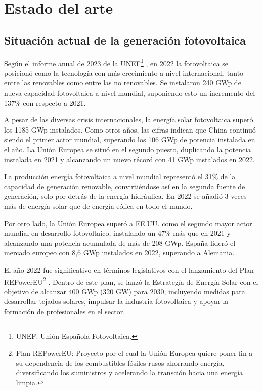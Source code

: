 \chapter{Estado del arte}
\label{chap:estado-arte}
\section{Situación actual de la generación fotovoltaica}
\label{sec:orge7633b7}
\label{sec:situacion-actual-generacion-fotovoltaica}
Según el informe anual de 2023 de la UNEF\footnote{UNEF: Unión Española Fotovoltaica.} \cite{unef23}, en 2022 la fotovoltaica se posicionó como la tecnología con más crecimiento a nivel internacional, tanto entre las renovables como entre las no renovables. Se instalaron 240 GWp de nueva capacidad fotovoltaica a nivel mundial, suponiendo esto un incremento del 137\% con respecto a 2021.

A pesar de las diversas crisis internacionales, la energía solar fotovoltaica superó los 1185 GWp instalados. Como otros años, las cifras indican que China continuó siendo el primer actor mundial, superando los 106 GWp de potencia instalada en el año. La Unión Europea se situó en el segundo puesto, duplicando la potencia instalada en 2021 y alcanzando un nuevo récord con 41 GWp instalados en 2022.

La producción energía fotovoltaica a nivel mundial representó el 31\% de la capacidad de generación renovable, convirtiéndose así en la segunda fuente de generación, solo por detrás de la energía hidráulica. En 2022 se añadió 3 veces más de energía solar que de energía eólica en todo el mundo.

Por otro lado, la Unión Europea superó a EE.UU. como el segundo mayor actor mundial en desarrollo fotovoltaico, instalando un 47\% más que en 2021 y alcanzando una potencia acumulada de más de 208 GWp. España lideró el mercado europeo con 8,6 GWp instalados en 2022, superando a Alemania.

El año 2022 fue significativo en términos legislativos con el lanzamiento del Plan REPowerEU\footnote{Plan REPowerEU: Proyecto por el cual la Unión Europea quiere poner fin a su dependencia de los combustibles fósiles rusos ahorrando energía, diversificando los suministros y acelerando la transción hacia una energía limpia.} \cite{europeo22}. Dentro de este plan, se lanzó la Estrategía de Energía Solar con el objetivo de alcanzar 400 GWp (320 GW) para 2030, incluyendo medidas para desarrollar tejados solares, impulsar la industria fotovoltaica y apoyar la formación de profesionales en el sector.

